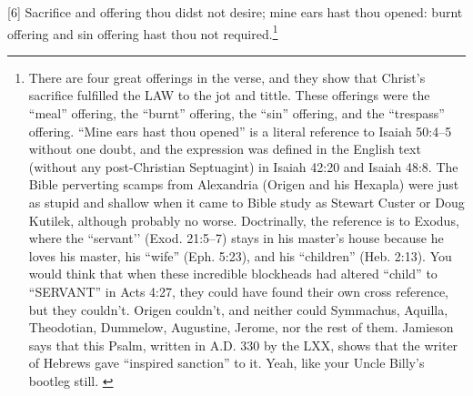 [6] \textcolor[rgb]{0.00,0.00,1.00}{Sacrifice and offering thou didst not desire; mine ears hast thou opened: burnt offering and sin offering hast thou not required.}\footnote{There are four great offerings in the verse, and they show that Christ’s sacrifice fulfilled the LAW to the jot and tittle. These offerings were the “meal” offering, the “burnt” offering, the “sin” offering, and the “trespass” offering. “Mine ears hast thou opened” is a literal reference to Isaiah 50:4–5 without one doubt, and the expression was defined in the English text (without any post-Christian Septuagint) in Isaiah 42:20 and Isaiah 48:8. The Bible perverting scamps from Alexandria (Origen and his Hexapla) were just as stupid and shallow when it came to Bible study as Stewart Custer or Doug Kutilek, although probably no worse.
Doctrinally, the reference is to Exodus, where the “servant’’ (Exod. 21:5–7) stays in his master’s house because he loves his master, his “wife” (Eph. 5:23), and his “children” (Heb. 2:13). You would think that when these incredible blockheads had altered “child” to “SERVANT” in Acts 4:27, they could have found their own cross reference, but they couldn’t. Origen couldn’t, and neither could Symmachus, Aquilla, Theodotian, Dummelow, Augustine, Jerome, nor the rest of them. Jamieson says that this Psalm, written in A.D. 330 by the LXX, shows that the writer of Hebrews gave “inspired sanction” to it.
Yeah, like your Uncle Billy’s bootleg still. \cite{Ruckman1992Psalms}}

